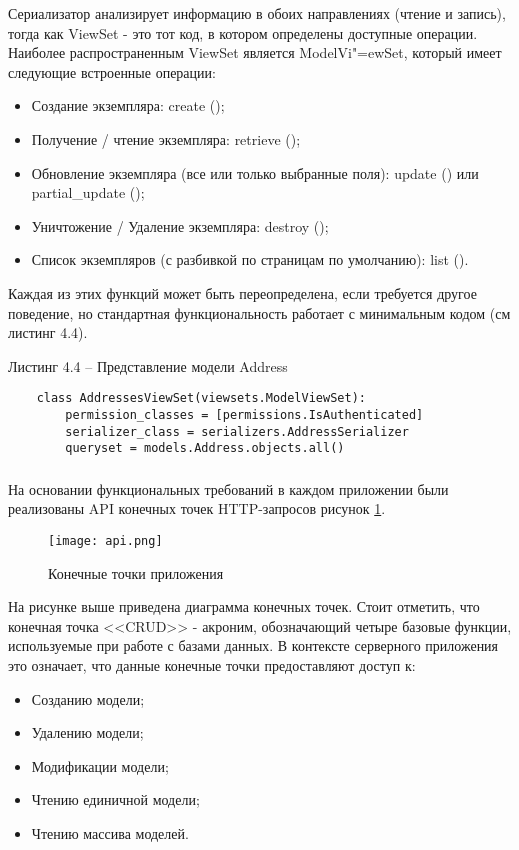 Сериализатор анализирует информацию в обоих направлениях (чтение и запись), тогда как ViewSet - это тот код, в котором определены доступные операции.
Наиболее распространенным ViewSet является ModelVi"=ewSet, который имеет следующие встроенные операции:
\begin{itemize}
    \item Создание экземпляра: create ();
    \item Получение / чтение экземпляра: retrieve ();
    \item Обновление экземпляра (все или только выбранные поля): update () или partial\_update ();
    \item Уничтожение / Удаление экземпляра: destroy ();
    \item Список экземпляров (с разбивкой по страницам по умолчанию): list ().
\end{itemize}

Каждая из этих функций может быть переопределена, если требуется другое поведение, но стандартная функциональность работает с минимальным кодом (см листинг 4.4).

Листинг 4.4 – Представление модели Address
\begin{lstlisting}
    class AddressesViewSet(viewsets.ModelViewSet):
        permission_classes = [permissions.IsAuthenticated]
        serializer_class = serializers.AddressSerializer
        queryset = models.Address.objects.all()
\end{lstlisting}

\subsubsection{}

На основании функциональных требований в каждом приложении были реализованы API конечных точек HTTP-запросов рисунок \ref{back:api}.

\begin{figure}
    \texttt{[image: api.png]}
    \caption{Конечные точки приложения}
    \label{back:api}
\end{figure}

На рисунке выше приведена диаграмма конечных точек.
Стоит отметить, что конечная точка <<CRUD>> -  акроним, обозначающий четыре базовые функции, используемые при работе с базами данных.
В контексте серверного приложения это означает, что данные конечные точки предоставляют доступ к:
\begin{itemize}
    \item Созданию модели;
    \item Удалению модели;
    \item Модификации модели;
    \item Чтению единичной модели;
    \item Чтению массива моделей.
\end{itemize}


